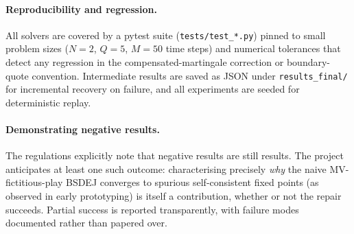 \documentclass[11pt,a4paper]{article}
\begin{document}
\paragraph{Reproducibility and regression.}
All solvers are covered by a pytest suite
(\texttt{tests/test\_*.py}) pinned to small problem sizes
($N = 2$, $Q = 5$, $M = 50$ time steps) and numerical tolerances
that detect any regression in the compensated-martingale correction
or boundary-quote convention.  Intermediate results are saved as
JSON under \texttt{results\_final/} for incremental recovery on
failure, and all experiments are seeded for deterministic replay.

\paragraph{Demonstrating negative results.}
The regulations explicitly note that negative results are still
results.  The project anticipates at least one such outcome:
characterising precisely \emph{why} the naive MV-fictitious-play
BSDEJ converges to spurious self-consistent fixed points (as
observed in early prototyping) is itself a contribution, whether
or not the repair succeeds.  Partial success is reported
transparently, with failure modes documented rather than papered
over.


\small

\end{document}
